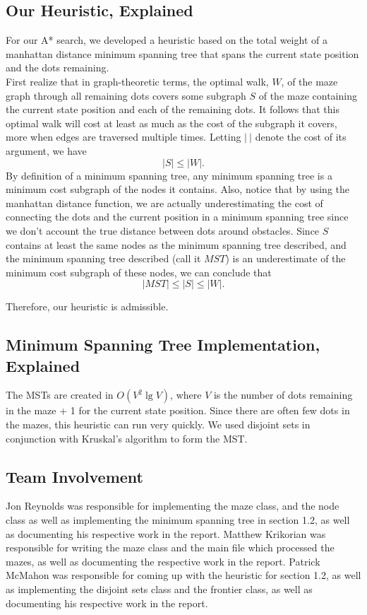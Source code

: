 \documentclass[titlepage]{article}
\begin{document}
\newpage

\subsection*{Our Heuristic, Explained}
For our A* search, we developed a heuristic based on the total weight of a manhattan distance minimum spanning tree that spans the current state position and the dots remaining. \\

\noindent First realize that in graph-theoretic terms, the optimal walk, $W$, of the maze graph through all remaining dots covers some subgraph $S$ of the maze containing the current state position and each of the remaining dots. It follows that this optimal walk will cost at least as much as the cost of the subgraph it covers, more when edges are traversed multiple times. Letting $|\ |$ denote the cost of its argument, we have
$$|S| \le |W|.$$
\noindent By definition of a minimum spanning tree, any minimum spanning tree is a minimum cost subgraph of the nodes it contains. Also, notice that by using the manhattan distance function, we are actually underestimating the cost of connecting the dots and the current position in a minimum spanning tree since we don't account the true distance between dots around obstacles. Since $S$ contains at least the same nodes as the minimum spanning tree described, and the minimum spanning tree described (call it $MST$) is an underestimate of the minimum cost subgraph of these nodes, we can conclude that
$$|MST| \le |S| \le |W|.$$

\noindent Therefore, our heuristic is admissible. 

\subsection*{Minimum Spanning Tree Implementation, Explained}
The MSTs are created in $O(V^2 \lg V)$, where $V$ is the number of dots remaining in the maze + 1 for the current state position. Since there are often few dots in the mazes, this heuristic can run very quickly. We used disjoint sets in conjunction with Kruskal's algorithm to form the MST.




\subsection*{Team Involvement}
Jon Reynolds was responsible for implementing the maze class, and the node class as well as implementing the minimum spanning tree in section 1.2, as well as documenting his respective work in the report. Matthew Krikorian was responsible for writing the maze class and the main file which processed the mazes, as well as documenting the respective work in the report. Patrick McMahon was responsible for coming up with the heuristic for section 1.2, as well as implementing the disjoint sets class and the frontier class, as well as documenting his respective work in the report.
\end{document}
